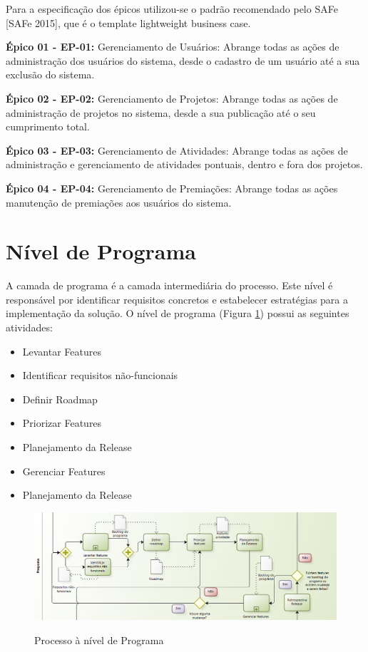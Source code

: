 Para a especificação dos épicos utilizou-se o padrão recomendado pelo SAFe [SAFe 2015], que é o template  lightweight business case.

\textbf{Épico 01 - EP-01:} Gerenciamento de Usuários: Abrange todas as ações de administração dos usuários do sistema, desde o cadastro de um usuário até a sua exclusão do sistema.

\textbf{Épico 02 - EP-02:} Gerenciamento de Projetos: Abrange todas as ações de administração de projetos no sistema, desde a sua publicação até o seu cumprimento total.

\textbf{Épico 03 - EP-03:} Gerenciamento de Atividades: Abrange todas as ações de administração e gerenciamento de atividades pontuais, dentro e fora dos projetos.

\textbf{Épico 04 - EP-04:} Gerenciamento de Premiações: Abrange todas as ações manutenção de premiações aos usuários do sistema.

\section {Nível de Programa}
A camada de programa é a camada intermediária do processo. Este nível é responsável por identificar requisitos concretos e estabelecer estratégias para a implementação da solução. O nível de programa (Figura \ref{img:programa}) possui as seguintes atividades:

\begin{itemize}
\item Levantar Features
\item Identificar requisitos não-funcionais
\item Definir Roadmap
\item Priorizar Features
\item Planejamento da Release
\item Gerenciar Features
\item Planejamento da Release
\end{itemize}

\FloatBarrier
\begin{figure}[!htpd]
		\centering
		\includegraphics[scale=0.4]{figuras/programa}
		\label{img:programa}
		\caption{Processo à nível de Programa}
\end{figure}

